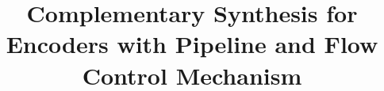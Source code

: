 \documentclass[runningheads,a4paper,orivec]{llncs}
\begin{document}
\mainmatter  %

\title{Complementary Synthesis for Encoders with Pipeline and Flow Control Mechanism}


%
%
\author{}

\authorrunning{}

\institute{}

%
%

\maketitle
\end{document}
